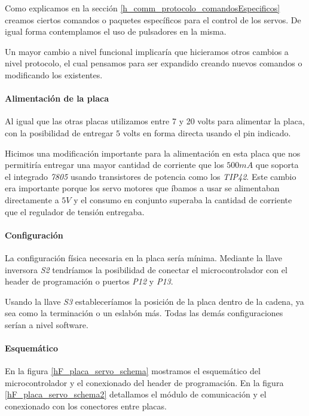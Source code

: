 Como explicamos en la secci\'on \ref{h_comm_protocolo_comandosEspecificos} creamos ciertos comandos
o paquetes espec\'ificos para el control de los servos.
De igual forma contemplamos el uso de pulsadores en la misma.

Un mayor cambio a nivel funcional implicar\'ia que hicieramos otros cambios a nivel protocolo, el cual
pensamos para ser expandido creando nuevos comandos o modificando los existentes.

\paragraph{Alimentaci\'on de la placa}
\label{h_placas_servos_alimentacion}

Al igual que las otras placas utilizamos entre 7 y 20 volts para alimentar la placa, con la posibilidad
de entregar $5$ volts en forma directa usando el pin indicado.

Hicimos una modificaci\'on importante para la alimentaci\'on en esta placa que nos permitir\'ia entregar
una mayor cantidad de corriente que los $500 mA$ que soporta el integrado \emph{7805} usando transistores
de potencia como los \emph{TIP42}.
Este cambio era importante porque los servo motores que \'ibamos a usar se alimentaban directamente a $5V$
y el consumo en conjunto superaba la cantidad de corriente que el regulador de tensi\'on entregaba.

\paragraph{Configuraci\'on}
\label{h_placas_servos_config}

La configuraci\'on f\'isica necesaria en la placa ser\'ia m\'inima.
Mediante la llave inversora \emph{S2} tendr\'iamos la posibilidad de conectar el microcontrolador
con el header de programaci\'on o puertos \emph{P12} y \emph{P13}.

Usando la llave \emph{S3} establecer\'iamos la posici\'on de la placa dentro de la cadena, ya sea
como la terminaci\'on o un eslab\'on m\'as.
Todas las dem\'as configuraciones ser\'ian a nivel software.

\paragraph{Esquem\'atico}
\label{h_placas_servos_esquematico}

En la figura \ref{hF_placa_servo_schema} mostramos el esquem\'atico del microcontrolador y el conexionado
del header de programaci\'on.
En la figura \ref{hF_placa_servo_schema2} detallamos el m\'odulo de comunicaci\'on y el conexionado con
los conectores entre placas.

